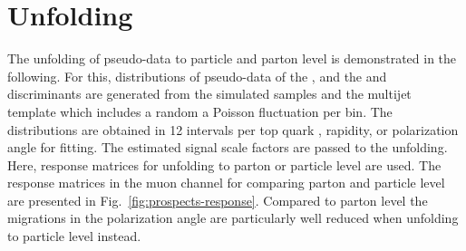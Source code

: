 

\section{Unfolding}

The unfolding of pseudo-data to particle and parton level is demonstrated in the following. For this, distributions of pseudo-data of the \mtw, and the \bdttt and \bdttch discriminants are generated from the simulated samples and the multijet template which includes a random a Poisson fluctuation per bin. The distributions are obtained in 12 intervals per top quark \pt, rapidity, or polarization angle for fitting. The estimated signal scale factors are passed to the unfolding. Here, response matrices for unfolding to parton or particle level are used. The response matrices in the muon channel for comparing parton and particle level are presented in Fig.~\ref{fig:prospects-response}. Compared to parton level the migrations in the polarization angle are particularly well reduced when unfolding to particle level instead.


